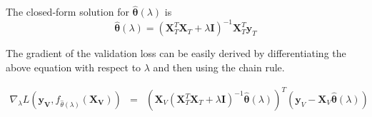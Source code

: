 \documentclass[10pt,letterpaper]{article}
\begin{document}
The closed-form solution for $\hat{\boldsymbol{\theta}}(\lambda)$ is
\begin{equation}
\hat{\boldsymbol{\theta}} (\lambda) = (\boldsymbol{X}_T^T\boldsymbol{X}_T + \lambda \boldsymbol{I})^{-1}\boldsymbol{X}_T^T\boldsymbol{y}_T
\end{equation}

The gradient of the validation loss can be easily derived by differentiating the above equation with respect to $\lambda$ and then using the chain rule.

\begin{equation}
\begin{array} {lcl}
\nabla_{\lambda} L(\boldsymbol{y_V}, f_{\hat \theta(\lambda)}(\boldsymbol{X_V}))
&=& (\boldsymbol{X}_V(\boldsymbol{X}_T^T \boldsymbol{X}_T + \lambda \boldsymbol{I})^{-1}
\hat{\boldsymbol{\theta}}(\lambda))^T(\boldsymbol{y}_V - \boldsymbol{X}_V \hat{\boldsymbol{\theta}}(\lambda))
\end{array}
\end{equation}
\end{document}

